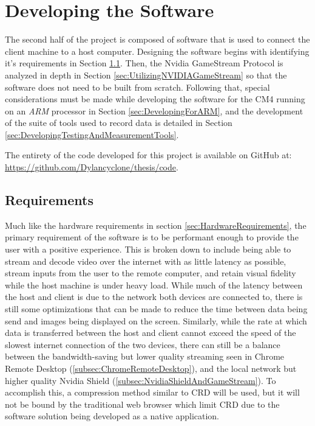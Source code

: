 \chapter{Developing the Software}

\label{Chapter5}

The second half of the project is composed of software that is used to connect the client machine to a host computer.
Designing the software begins with identifying it's requirements in Section \ref{sec:SoftwareRequirements}.
Then, the Nvidia GameStream Protocol is analyzed in depth in Section \ref{sec:UtilizingNVIDIAGameStream} so that the software does not need to be built from scratch.
Following that, special considerations must be made while developing the software for the CM4 running on an \emph{ARM} processor in Section \ref{sec:DevelopingForARM}, and the development of the suite of tools used to record data is detailed in Section \ref{sec:DevelopingTestingAndMeasurementTools}.

The entirety of the code developed for this project is available on GitHub at: \url{https://github.com/Dylancyclone/thesis/code}.


\section{Requirements}\label{sec:SoftwareRequirements}

Much like the hardware requirements in section \ref{sec:HardwareRequirements}, the primary requirement of the software is to be performant enough to provide the user with a positive experience.
This is broken down to include being able to stream and decode video over the internet with as little latency as possible, stream inputs from the user to the remote computer, and retain visual fidelity while the host machine is under heavy load.
While much of the latency between the host and client is due to the network both devices are connected to, there is still some optimizations that can be made to reduce the time between data being send and images being displayed on the screen.
Similarly, while the rate at which data is transferred between the host and client cannot exceed the speed of the slowest internet connection of the two devices, there can still be a balance between the bandwidth-saving but lower quality streaming seen in Chrome Remote Desktop (\ref{subsec:ChromeRemoteDesktop}), and the local network but higher quality Nvidia Shield (\ref{subsec:NvidiaShieldAndGameStream}).
To accomplish this, a compression method similar to CRD will be used, but it will not be bound by the traditional web browser which limit CRD due to the software solution being developed as a native application.

